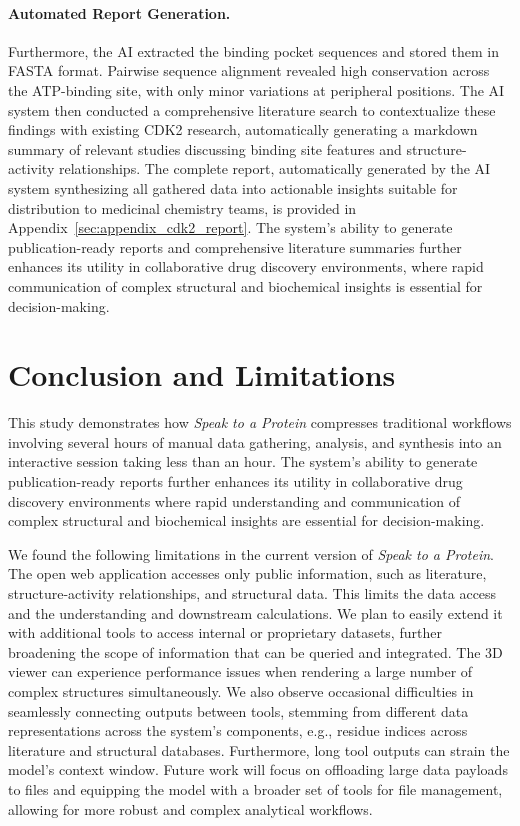 \documentclass{article}
\begin{document}
\paragraph{Automated Report Generation.}
Furthermore, the AI extracted the binding pocket sequences and stored them in FASTA format. Pairwise sequence alignment revealed high conservation across the ATP-binding site, with only minor variations at peripheral positions. The AI system then conducted a comprehensive literature search to contextualize these findings with existing CDK2 research, automatically generating a markdown summary of relevant studies discussing binding site features and structure-activity relationships.
The complete report, automatically generated by the AI system synthesizing all gathered data into actionable insights suitable for distribution to medicinal chemistry teams, is provided in Appendix~\ref{sec:appendix_cdk2_report}.
The system's ability to generate publication-ready reports and comprehensive literature summaries further enhances its utility in collaborative drug discovery environments, where rapid communication of complex structural and biochemical insights is essential for decision-making.

\section{Conclusion and Limitations}\label{sec:discussion}

This study demonstrates how \emph{Speak to a Protein} compresses traditional workflows involving several hours of manual data gathering, analysis, and synthesis into an interactive session taking less than an hour. The system's ability to generate publication-ready reports further enhances its utility in collaborative drug discovery environments where rapid understanding and communication of complex structural and biochemical insights are essential for decision-making.

We found the following limitations in the current version of \emph{Speak to a Protein}. The open web application accesses only public information, such as literature, structure-activity relationships, and structural data. This limits the data access and the understanding and downstream calculations. We plan to easily extend it with additional tools to access internal or proprietary datasets, further broadening the scope of information that can be queried and integrated.
 The 3D viewer can experience performance issues when rendering a large number of complex structures simultaneously. We also observe occasional difficulties in seamlessly connecting outputs between tools, stemming from different data representations across the system's components, e.g., residue indices across literature and structural databases. Furthermore, long tool outputs can strain the model's context window. Future work will focus on offloading large data payloads to files and equipping the model with a broader set of tools for file management, allowing for more robust and complex analytical workflows.
\end{document}
